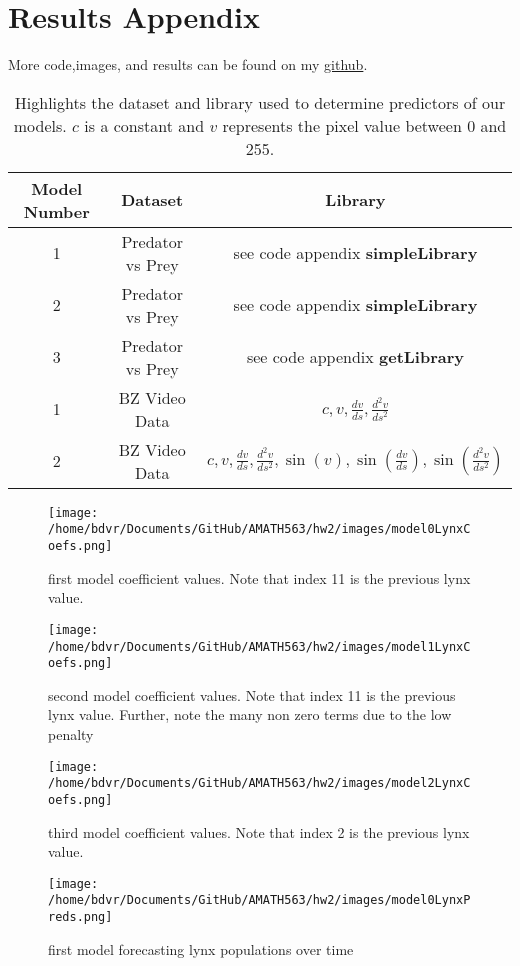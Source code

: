 \documentclass[12pt]{article}
\begin{document}
	\section{Results Appendix}
	More code,images, and results can be found on my \href{https://github.com/bogyshi/AMATH563}{github}. 
	\begin{table}[H]
		\begin{center}
			\begin{tabular}{ccc}
				\toprule
				Model Number & Dataset & Library\\
				\midrule
				1&Predator vs Prey& see code appendix \textbf{simpleLibrary}\\
				2&Predator vs Prey& see code appendix \textbf{simpleLibrary}\\
				3&Predator vs Prey& see code appendix \textbf{getLibrary}\\
				1&BZ Video Data& $c,v , \frac{dv}{ds} , \frac{d^2v}{ds^2}$\\
				2&BZ Video Data& $c,v , \frac{dv}{ds} , \frac{d^2v}{ds^2} , \sin(v),\sin(\frac{dv}{ds}),\sin(\frac{d^2v}{ds^2})$\\
				
				\bottomrule
			\end{tabular}
			
			\caption{Highlights the dataset and library used to determine predictors of our models. $c$ is a constant and $v$ represents the pixel value between 0 and 255.}
		\end{center}
	\end{table}
\begin{figure}[H]
	\texttt{[image: /home/bdvr/Documents/GitHub/AMATH563/hw2/images/model0LynxCoefs.png]}
	\caption{first model coefficient values. Note that index 11 is the previous lynx value.}
\end{figure}
\begin{figure}[H]
	\texttt{[image: /home/bdvr/Documents/GitHub/AMATH563/hw2/images/model1LynxCoefs.png]}
	\caption{second model coefficient values. Note that index 11 is the previous lynx value. Further, note the many non zero terms due to the low penalty}
\end{figure}
\begin{figure}[H]
	\texttt{[image: /home/bdvr/Documents/GitHub/AMATH563/hw2/images/model2LynxCoefs.png]}
	\caption{third model coefficient values. Note that index 2 is the previous lynx value.}
\end{figure}
\begin{figure}[H]
	\texttt{[image: /home/bdvr/Documents/GitHub/AMATH563/hw2/images/model0LynxPreds.png]}
	\caption{first model forecasting lynx populations over time}
\end{figure}
\end{document}
